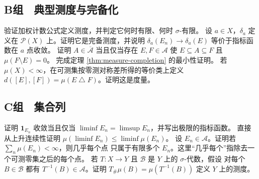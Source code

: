 \subsection*{B组　典型测度与完备化}
\begin{enumerate}[label=\textbf{\thechapter.\arabic*.},resume]
 验证加权计数公式定义测度，并判定它何时有限、何时 $\sigma$-有限。
 设 $a\in X$，$\delta_a$ 定义在 $\mathcal P(X)$ 上。证明它是完备测度，并说明
 $\delta_a(E_n)\to\delta_a(E)$ 等价于指标函数在 $a$ 点收敛。
 证明 $A\in\overline{\mathcal A}$ 当且仅当存在 $E,F\in\mathcal A$ 使
 $E\subseteq A\subseteq F$ 且 $\mu(F\setminus E)=0$。
 完成定理 \ref{thm:measure-completion} 的最小性证明。
 若 $\mu(X)<\infty$，在可测集按零测对称差所得的等价类上定义
 $d([E],[F])=\mu(E\mathbin\triangle F)$。证明这是度量。
\end{enumerate}

\subsection*{C组　集合列}
\begin{enumerate}[label=\textbf{\thechapter.\arabic*.},resume]
 证明 $\mathbf1_{E_n}$ 收敛当且仅当
 $\liminf E_n=\limsup E_n$，并写出极限的指标函数。
 直接从上升连续性证明
 $\mu(\liminf E_n)\le\liminf\mu(E_n)$。
 设 $E_n\in\mathcal A$。证明若 $\sum_n\mu(E_n)<\infty$，则几乎每个点
 只属于有限多个 $E_n$。这里“几乎每个”指除去一个可测零集之后的每个点。
 若 $T:X\to Y$ 且 $\mathcal B$ 是 $Y$ 上的 $\sigma$-代数，假设
 对每个 $B\in\mathcal B$ 都有 $T^{-1}(B)\in\mathcal A$。证明
 $T_\#\mu(B)=\mu(T^{-1}(B))$ 定义 $Y$ 上的测度。
\end{enumerate}
